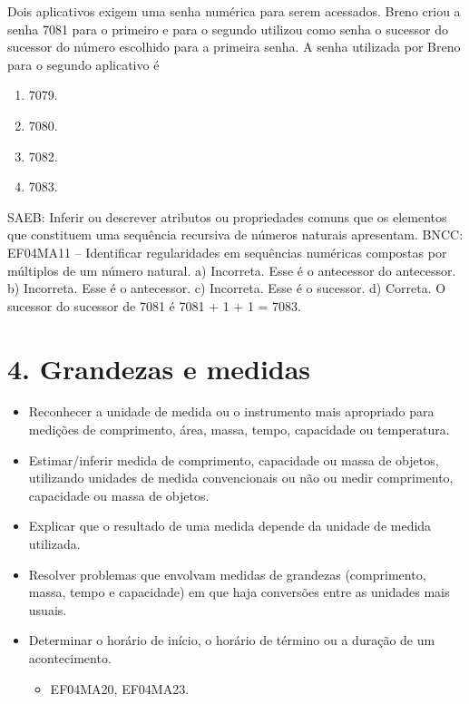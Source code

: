 \begin{enumerate}
\begin{escolha}
\begin{enumerate}
Dois aplicativos exigem uma senha numérica para serem acessados. Breno
criou a senha 7081 para o primeiro e para o segundo utilizou como senha
o sucessor do sucessor do número escolhido para a primeira senha. A
senha utilizada por Breno para o segundo aplicativo é

\begin{enumerate}
\def\labelenumi{\alph{enumi})}
\item
  7079.
\item
  7080.
\item
  7082.
\item
  7083.
\end{enumerate}

SAEB: Inferir ou descrever atributos ou propriedades comuns que os elementos que constituem uma sequência recursiva de números naturais apresentam.
BNCC: EF04MA11 -- Identificar regularidades em sequências numéricas compostas por múltiplos de um
número natural.
a) Incorreta. Esse é o antecessor do antecessor.
b) Incorreta. Esse é o antecessor.
c) Incorreta. Esse é o sucessor.
d) Correta. O sucessor do sucessor de 7081 é 7081 + 1 + 1 = 7083.


\section{4. Grandezas e medidas}\label{muxf3dulo-4}


\begin{itemize}
\item Reconhecer a unidade de medida ou o instrumento mais apropriado para
medições de comprimento, área, massa, tempo, capacidade ou temperatura.
\item Estimar/inferir medida de comprimento, capacidade ou massa de objetos,
utilizando unidades de medida convencionais ou não ou medir comprimento,
capacidade ou massa de objetos.
\item Explicar que o resultado de uma medida depende da unidade de medida
utilizada.
\item Resolver problemas que envolvam medidas de grandezas (comprimento,
massa, tempo e capacidade) em que haja conversões entre as unidades mais
usuais.
\item Determinar o horário de início, o horário de término ou a duração de
um acontecimento.


\begin{itemize}
\item EF04MA20, EF04MA23.
\end{itemize}


\end{itemize}
\end{enumerate}
\end{escolha}
\end{enumerate}
